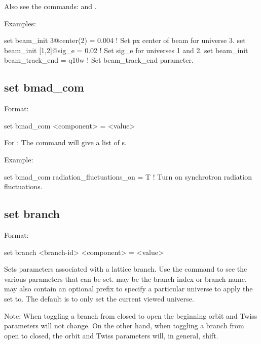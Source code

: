 {{Also see the commands:  and .

Examples:
\begin{example}
  set beam_init 3@center(2) = 0.004   ! Set px center of beam for universe 3.
  set beam_init [1,2]@sig_e = 0.02    ! Set sig_e for universes 1 and 2.
  set beam_init beam_track_end = q10w ! Set beam_track_end parameter.
\end{example}


\subsection{set bmad_com}
\label{s:set.bmad.com}

Format:
\begin{example}
  set bmad_com <component> = <value>
\end{example}

For : The  command will give a list of 
s.

Example:
\begin{example}
  set bmad_com radiation_fluctuations_on = T ! Turn on synchrotron radiation fluctuations.
\end{example}


\subsection{set branch}
\label{s:set.branch}

Format:
\begin{example}
  set branch <branch-id> <component> = <value>
\end{example}

Sets parameters associated with a lattice branch. Use the  command to see the
various parameters that can be set.  may be the branch index or branch name.
 may also contain an optional  prefix to specify a particular universe to
apply the set to. The default is to only set the current viewed universe.

Note: When toggling a branch from closed to open the beginning orbit and Twiss parameters will not
change. On the other hand, when toggling a branch from open to closed, the orbit and Twiss
parameters will, in general, shift.

}}
